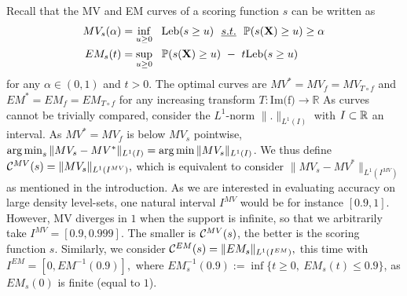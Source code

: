 Recall that the MV and EM curves of a scoring function $s$ can be written as
\noindent
\begin{align}
\label{intro:MV-def}
 MV_s(\alpha) &= \inf_{u \ge 0}~~ \text{Leb}(s \ge u) ~~\emph{s.t.}{}~~\mathbb{P}(s(\mathbf X) \ge u) \ge \alpha\\
\label{intro:EM-def}
 EM_s(t) &= \sup_{u \ge 0}~~ \mathbb{P}(s(\mathbf X) \ge u) ~-~ t \text{Leb}(s \ge u)
\end{align}
for any $\alpha\in (0,1)$ and $t >0$.
%
The optimal curves are $MV^* = MV_f = MV_{T \circ f}$ and $EM^* = EM_f = EM_{T \circ f}$ for any increasing transform $T: \text{Im(f)} \to \mathbb{R}$
%
As curves cannot be trivially compared, consider the $L^1$-norm $\|.\|_{L^1(I)}$ with $I\subset \mathbb{R}$ an interval. As $MV^*=MV_f$ is below $MV_s$ pointwise, $\argmin_s \| MV_s - MV^* \|_{L^1(I)} = \argmin \| MV_s \|_{L^1(I)} $. We thus define
$\mathcal{C}^{MV}(s) = \| MV_s \|_{L^1(I^{MV})},$ which is equivalent to consider $\| MV_s - MV^* \|_{L^1(I^{MV})}$ as mentioned in the introduction. As we are interested in evaluating accuracy on large density level-sets, one natural interval $I^{MV}$ would be for instance $[0.9, 1]$. However, MV diverges in $1$ when the support is infinite, so that we arbitrarily take $I^{MV} = [0.9, 0.999].$
The smaller is $\mathcal{C}^{MV}(s)$, the better is the scoring function $s$.
%
Similarly, we consider $\mathcal{C}^{EM}(s) = \| EM_s \|_{L^1(I^{EM})}, $ this time with $I^{EM} = [0,EM^{-1}(0.9)],$ where $EM_s^{-1}(0.9) := \inf\{t\ge 0,~ EM_s(t) \le 0.9\}$, as $EM_s(0)$ is finite (equal to $1$). %

